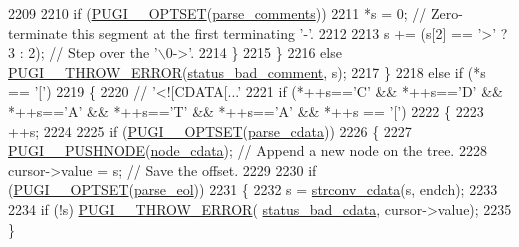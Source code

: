 \begin{DoxyCode}
2209 
2210                         \textcolor{keywordflow}{if} (\hyperlink{pugixml_8cpp_a06966692c7864407ceffff065b4d7da2}{PUGI\_\_OPTSET}(\hyperlink{namespacepugi_adcab316176bfaf69158339962fb4ad38}{parse\_comments}))
2211                             *s = 0; \textcolor{comment}{// Zero-terminate this segment at the first terminating '-'.}
2212 
2213                         s += (s[2] == \textcolor{charliteral}{'>'} ? 3 : 2); \textcolor{comment}{// Step over the '\(\backslash\)0->'.}
2214                     \}
2215                 \}
2216                 \textcolor{keywordflow}{else} \hyperlink{pugixml_8cpp_a8af02d87a10272f03f96ab93a96d7202}{PUGI\_\_THROW\_ERROR}(\hyperlink{namespacepugi_a9054ca609e12afb8f3e5892fc6c0b555a563327f534e9b3ce55f9f7364aa746b2}{status\_bad\_comment}, s);
2217             \}
2218             \textcolor{keywordflow}{else} \textcolor{keywordflow}{if} (*s == \textcolor{charliteral}{'['})
2219             \{
2220                 \textcolor{comment}{// '<![CDATA[...'}
2221                 \textcolor{keywordflow}{if} (*++s==\textcolor{charliteral}{'C'} && *++s==\textcolor{charliteral}{'D'} && *++s==\textcolor{charliteral}{'A'} && *++s==\textcolor{charliteral}{'T'} && *++s==\textcolor{charliteral}{'A'} && *++s == \textcolor{charliteral}{'['})
2222                 \{
2223                     ++s;
2224 
2225                     \textcolor{keywordflow}{if} (\hyperlink{pugixml_8cpp_a06966692c7864407ceffff065b4d7da2}{PUGI\_\_OPTSET}(\hyperlink{namespacepugi_a47b679897f8bc15e4e152978fc88c208}{parse\_cdata}))
2226                     \{
2227                         \hyperlink{pugixml_8cpp_accdd212cd2831662c3c2dda668246f8a}{PUGI\_\_PUSHNODE}(\hyperlink{namespacepugi_a137e94a038e4ab0ada6477cf7f6153a9adf13d60a4dfd047be0700e1711aeb1ea}{node\_cdata}); \textcolor{comment}{// Append a new node on the
       tree.}
2228                         cursor->value = s; \textcolor{comment}{// Save the offset.}
2229 
2230                         \textcolor{keywordflow}{if} (\hyperlink{pugixml_8cpp_a06966692c7864407ceffff065b4d7da2}{PUGI\_\_OPTSET}(\hyperlink{namespacepugi_ad4e017365d2ff3ee04e226c35129b475}{parse\_eol}))
2231                         \{
2232                             s = \hyperlink{pugixml_8cpp_a9caa489db9fff49dc8819a48849627c0}{strconv\_cdata}(s, endch);
2233 
2234                             \textcolor{keywordflow}{if} (!s) \hyperlink{pugixml_8cpp_a8af02d87a10272f03f96ab93a96d7202}{PUGI\_\_THROW\_ERROR}(
      \hyperlink{namespacepugi_a9054ca609e12afb8f3e5892fc6c0b555aa2ebdaf5e8bf5414bec3004270e102b8}{status\_bad\_cdata}, cursor->value);
2235                         \}

\end{DoxyCode}
